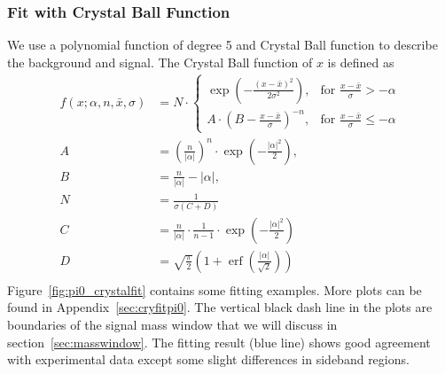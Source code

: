\subsubsection{Fit with Crystal Ball Function}
\label{sec:crystalBallFit}
We use a polynomial function of degree 5 and Crystal Ball function to describe the background and signal. The Crystal Ball function of $x$ is defined as~\cite{CrystalBallFunc}
\begin{subequations}
\begin{align}
f(x;\alpha,n,\bar x,\sigma) & = N \cdot \begin{cases} \exp(- \frac{(x - \bar x)^2}{2 \sigma^2}), & \mbox{for }\frac{x - \bar x}{\sigma} > -\alpha \\
 A \cdot (B - \frac{x - \bar x}{\sigma})^{-n}, & \mbox{for }\frac{x - \bar x}{\sigma} \leqslant -\alpha \end{cases}\\
A & = \left(\frac{n}{\left| \alpha \right|}\right)^n \cdot \exp\left(- \frac {\left| \alpha \right|^2}{2}\right), \\
B &= \frac{n}{\left| \alpha \right|}  - \left| \alpha \right|,\\
N &= \frac{1}{\sigma (C + D)}\\
C &= \frac{n}{\left| \alpha \right|} \cdot \frac{1}{n-1} \cdot \exp\left(- \frac {\left| \alpha \right|^2}{2}\right) \\
D &= \sqrt{\frac{\pi}{2}} \left(1 + \operatorname{erf}\left(\frac{\left| \alpha \right|}{\sqrt 2}\right)\right) \\
\end{align}
\label{eqn:crystalball}
\end{subequations}
Figure~\ref{fig:pi0_crystalfit} contains some fitting examples. More plots can be found in Appendix~\ref{sec:cryfitpi0}. 
  The vertical black dash line in the plots are boundaries of the signal mass window that we will discuss in section~\ref{sec:masswindow}. The fitting result (blue line) shows good agreement with experimental data except some slight differences in sideband regions. 
